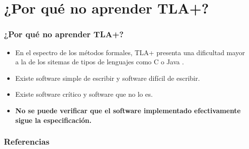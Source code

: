 \documentclass{beamer}
\begin{document}
\section{¿Por qué no aprender TLA+?}

\begin{frame}
  \frametitle{¿Por qué no aprender TLA+?}

  \begin{itemize}
    \item En el espectro de los métodos formales, TLA+ presenta una dificultad mayor a la de los sitemas de tipos de lenguajes como C o Java \cite{fisher2017hacms}.
    \item Existe software simple de escribir y software difícil de escribir.
    \item Existe software crítico y software que no lo es.
    \item \textbf{No se puede verificar que el software implementado efectivamente sigue la especificación.}
  \end{itemize}
\end{frame}

\begin{frame}[allowframebreaks]
        \frametitle{Referencias}
        
        
\end{frame}
\end{document}
